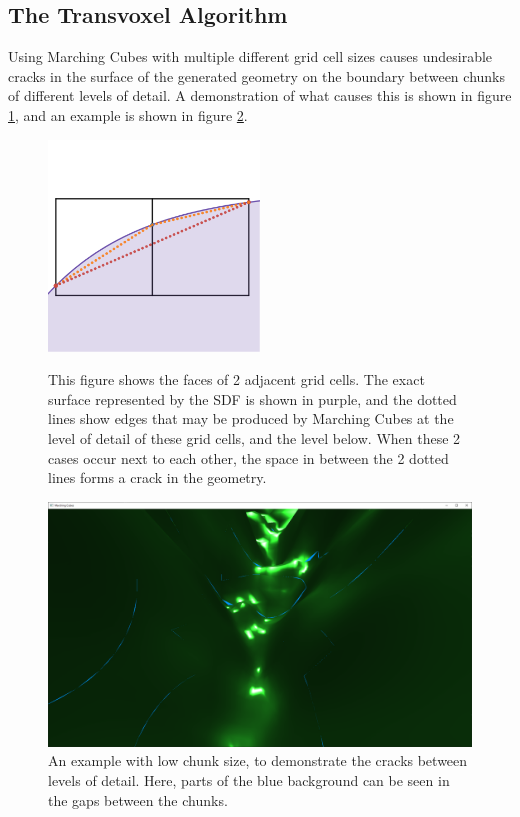 \documentclass[11pt]{article}
\begin{document}
\subsection{The Transvoxel Algorithm}
\label{section:cracks}
Using Marching Cubes with multiple different grid cell sizes causes undesirable cracks in the surface of the generated geometry on the boundary between chunks of different levels of detail. A demonstration of what causes this is shown in figure \ref{fig:cracks_demo}, and an example is shown in figure \ref{fig:cracks2}.

\begin{figure}
  \caption{This figure shows the faces of 2 adjacent grid cells. The exact surface represented by the SDF is shown in purple, and the dotted lines show edges that may be produced by Marching Cubes at the level of detail of these grid cells, and the level below. When these 2 cases occur next to each other, the space in between the 2 dotted lines forms a crack in the geometry.}
  \includegraphics[width=0.5\textwidth]{cracks_demo.png}
  \label{fig:cracks_demo}
\end{figure}

\begin{figure}[H]
  \includegraphics[width=\textwidth]{cracks2.png}
  \caption{An example with low chunk size, to demonstrate the cracks between levels of detail. Here, parts of the blue background can be seen in the gaps between the chunks.}
  \label{fig:cracks2}
\end{figure}
\end{document}
